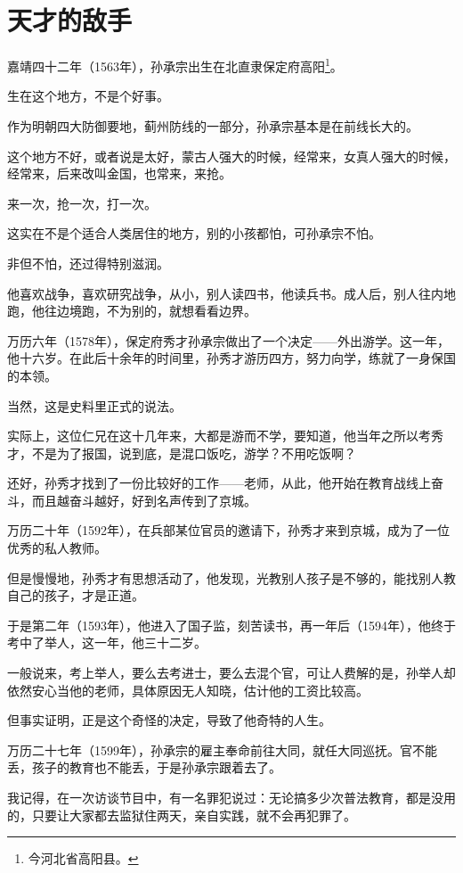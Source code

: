 \section{天才的敌手}
\ifnum{}
	\begin{multicols}{\theparacolNo}
		\fi
		嘉靖四十二年（1563年），孙承宗出生在北直隶保定府高阳\footnote{今河北省高阳县。}。

		生在这个地方，不是个好事。

		作为明朝四大防御要地，蓟州防线的一部分，孙承宗基本是在前线长大的。

		这个地方不好，或者说是太好，蒙古人强大的时候，经常来，女真人强大的时候，经常来，后来改叫金国，也常来，来抢。

		来一次，抢一次，打一次。

		这实在不是个适合人类居住的地方，别的小孩都怕，可孙承宗不怕。

		非但不怕，还过得特别滋润。

		他喜欢战争，喜欢研究战争，从小，别人读四书，他读兵书。成人后，别人往内地跑，他往边境跑，不为别的，就想看看边界。

		万历六年（1578年），保定府秀才孙承宗做出了一个决定——外出游学。这一年，他十六岁。在此后十余年的时间里，孙秀才游历四方，努力向学，练就了一身保国的本领。

		当然，这是史料里正式的说法。

		实际上，这位仁兄在这十几年来，大都是游而不学，要知道，他当年之所以考秀才，不是为了报国，说到底，是混口饭吃，游学？不用吃饭啊？

		还好，孙秀才找到了一份比较好的工作——老师，从此，他开始在教育战线上奋斗，而且越奋斗越好，好到名声传到了京城。

		万历二十年（1592年），在兵部某位官员的邀请下，孙秀才来到京城，成为了一位优秀的私人教师。

		但是慢慢地，孙秀才有思想活动了，他发现，光教别人孩子是不够的，能找别人教自己的孩子，才是正道。

		于是第二年（1593年），他进入了国子监，刻苦读书，再一年后（1594年），他终于考中了举人，这一年，他三十二岁。

		一般说来，考上举人，要么去考进士，要么去混个官，可让人费解的是，孙举人却依然安心当他的老师，具体原因无人知晓，估计他的工资比较高。

		但事实证明，正是这个奇怪的决定，导致了他奇特的人生。

		万历二十七年（1599年），孙承宗的雇主奉命前往大同，就任大同巡抚。官不能丢，孩子的教育也不能丢，于是孙承宗跟着去了。

		我记得，在一次访谈节目中，有一名罪犯说过：无论搞多少次普法教育，都是没用的，只要让大家都去监狱住两天，亲自实践，就不会再犯罪了。


\end{multicols}
